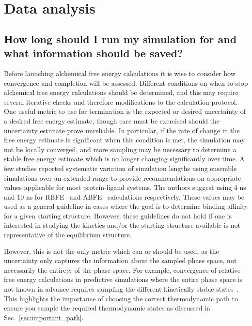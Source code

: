 \section{Data analysis \label{sec:data_analysis}}


\subsection{How long should I run my simulation for and what information should be saved?}
\label{sec:sim_length_information_kept}
Before launching alchemical free energy calculations it is wise to consider how convergence and completion will be assessed. Different conditions on when to stop alchemical free energy calculations should be determined, and this may require several iterative checks and therefore modifications to the calculation protocol.
One useful metric to use for termination is the expected or desired uncertainty of a desired free energy estimate, though care must be exercised should the uncertainty estimate prove unreliable.
In particular, if the rate of change in the free energy estimate is significant when this condition is met, the simulation may not be locally converged, and more sampling may be necessary to determine a stable free energy estimate which is no longer changing significantly over time. 
A few studies reported systematic variation of simulation lengths using ensemble simulations over an extended range to provide recommendations on appropriate values applicable for most protein-ligand systems. The authors suggest using 4 ns and 10 ns for RBFE~\cite{bhati2017, bhati2022, wan2023eqvsneq} and ABFE~\cite{bhati2025} calculations respectively. These values may be used as a general guideline in cases where the goal is to determine binding affinity for a given starting structure. However, these guidelines do not hold if one is interested in studying the kinetics and/or the starting structure available is not representative of the equilibrium structure.

However, this is not the only metric which can or should be used, as the uncertainty only captures the information about the sampled phase space, not necessarily the entirety of the phase space.  
For example, convergence of relative free energy calculations in predictive simulations where the entire phase space is not known in advance requires sampling the different kinetically stable states~\cite{mobley2012perspective}. 
This highlights the importance of choosing the correct thermodynamic path to ensure you sample the required thermodynamic states as discussed in Sec.~\ref{sec:important_path}.

